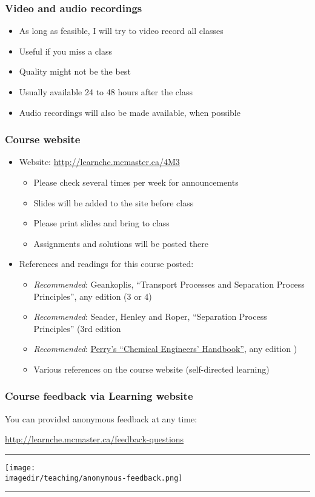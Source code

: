 \begin{frame}\frametitle{Video and audio recordings}
	\begin{itemize}
		\item	As long as feasible, I will try to video record all classes
		\item	Useful if you miss a class
		\item	Quality might not be the best
		\item	Usually available 24 to 48 hours after the class
		\item	Audio recordings will also be made available, when possible
	\end{itemize}
\end{frame}

\begin{frame}\frametitle{Course website}	
	\begin{itemize}
		\item	Website: \href{http://learnche.mcmaster.ca/4M3}{http://learnche.mcmaster.ca/4M3}
			\begin{itemize}
				\item	Please check several times per week for announcements
				\item	Slides will be added to the site before class
				\item	Please print slides and bring to class
				\item	Assignments and solutions will be posted there
			\end{itemize}
		\item	References and readings for this course posted:
		\begin{itemize}
			\item	\emph{Recommended}: Geankoplis, ``Transport Processes and Separation Process Principles'', any edition (3 or 4)
			\item	\emph{Recommended}: Seader, Henley and Roper, ``Separation Process Principles'' (3rd edition
			\item	\emph{Recommended}: \href{http://accessengineeringlibrary.com/browse/perrys-chemical-engineers-handbook-eighth-edition}{Perry's ``Chemical Engineers' Handbook''}, any edition
)
			\item	Various references on the course website (self-directed learning)
		\end{itemize}
	\end{itemize}
\end{frame}

\begin{frame}\frametitle{Course feedback via Learning website}
	
	You can provided anonymous feedback at any time:
	
	\vspace{12pt}
	\href{http://learnche.mcmaster.ca/feedback-questions}{http://learnche.mcmaster.ca/feedback-questions}
	\vspace{12pt}
	\hrule
	\begin{center}
		\texttt{[image: \\imagedir/teaching/anonymous-feedback.png]}
	\end{center}
	\hrule
\end{frame}

